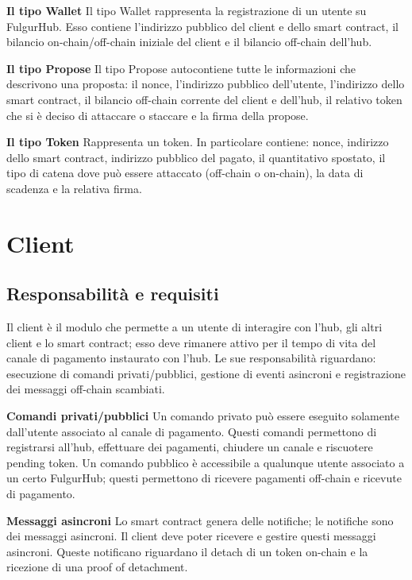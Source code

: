 \documentclass[12pt,italian,]{book}
\begin{document}
\textbf{\textbf{Il tipo Wallet}} Il tipo Wallet rappresenta la registrazione di un utente su FulgurHub. Esso contiene l'indirizzo pubblico del client e dello smart contract, il bilancio on-chain/off-chain iniziale del client e il bilancio off-chain dell'hub.

\textbf{\textbf{Il tipo Propose}} Il tipo Propose autocontiene tutte le informazioni che descrivono una proposta: il nonce, l'indirizzo pubblico dell'utente, l'indirizzo dello smart contract, il bilancio off-chain corrente del client e dell'hub, il relativo token che si è deciso di attaccare o staccare e la firma della propose.

\textbf{\textbf{Il tipo Token}} Rappresenta un token. In particolare contiene: nonce, indirizzo dello smart contract, indirizzo pubblico del pagato, il quantitativo spostato, il tipo di catena dove può essere attaccato (off-chain o on-chain), la data di scadenza e la relativa firma.

\hypertarget{client}{%
\section{Client}\label{client}}

\hypertarget{responsabilituxe0-e-requisiti-1}{%
\subsection{Responsabilità e requisiti}\label{responsabilituxe0-e-requisiti-1}}

Il client è il modulo che permette a un utente di interagire con l'hub, gli altri client e lo smart contract; esso deve rimanere attivo per il tempo di vita del canale di pagamento instaurato con l'hub. Le sue responsabilità riguardano: esecuzione di comandi privati/pubblici, gestione di eventi asincroni e registrazione dei messaggi off-chain scambiati.

\textbf{\textbf{Comandi privati/pubblici}} Un comando privato può essere eseguito solamente dall'utente associato al canale di pagamento. Questi comandi permettono di registrarsi all'hub, effettuare dei pagamenti, chiudere un canale e riscuotere pending token. Un comando pubblico è accessibile a qualunque utente associato a un certo FulgurHub; questi permettono di ricevere pagamenti off-chain e ricevute di pagamento.

\textbf{\textbf{Messaggi asincroni}} Lo smart contract genera delle notifiche; le notifiche sono dei messaggi asincroni. Il client deve poter ricevere e gestire questi messaggi asincroni. Queste notificano riguardano il detach di un token on-chain e la ricezione di una proof of detachment.
\end{document}
